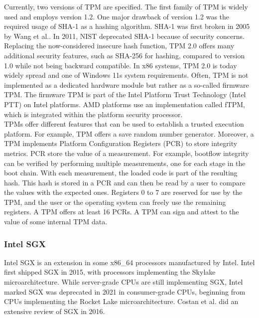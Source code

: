 Currently, two versions of TPM are specified. The first family of TPM is widely
used and employs version 1.2. One major drawback of version 1.2 was the required
usage of SHA-1 as a hashing algorithm. SHA-1 was first broken in 2005 by Wang et
al.\cite{wang2005collision}. In 2011, NIST deprecated SHA-1 because of security
concerns. Replacing the now-considered insecure hash function, TPM 2.0 offers
many additional security features, such as SHA-256 for hashing, compared to
version 1.0 while not being backward compatible. In x86 systems, TPM 2.0 is
today widely spread and one of Windows 11s system requirements. Often, TPM is
not implemented as a dedicated hardware module but rather as a so-called
firmware TPM. The firmware TPM is part of the Intel Platform Trust Technology
(Intel PTT) on Intel platforms. AMD platforms use an implementation called fTPM,
which is integrated within the platform security
processor.\cite{pirker2024brief} \\

TPMs offer different features that can be used to establish a trusted execution
platform. For example, TPM offers a save random number generator. Moreover, a
TPM implements Platform Configuration Registers (PCR) to store integrity
metrics. PCR store the value of a measurement. For example, bootflow integrity
can be verified by performing multiple measurements, one for each stage in the
boot chain. With each measurement, the loaded code is part of the resulting
hash. This hash is stored in a PCR and can then be read by a user to compare the
values with the expected ones. Registers 0 to 7 are reserved for use by the TPM,
and the user or the operating system can freely use the remaining registers. A
TPM offers at least 16 PCRs. A TPM can sign and attest to the value of some
internal TPM data. \\

\subsubsection{Intel SGX}
\label{sec:20:sgx}
Intel SGX is an extension in some x86\_64 processors manufactured by Intel.
Intel first shipped SGX in 2015, with processors implementing the Skylake
microarchitecture. While server-grade CPUs are still implementing SGX, Intel
marked SGX was deprecated in 2021 in consumer-grade CPUs, beginning from CPUs
implementing the Rocket Lake microarchitecture. Costan et al. did an extensive
review of SGX in 2016.\cite{costan2016intel} \\

